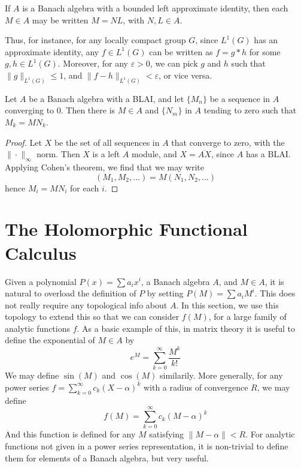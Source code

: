 \begin{corollary}
    If $A$ is a Banach algebra with a bounded left approximate identity, then each $M \in A$ may be written $M = NL$, with $N,L \in A$.
\end{corollary}

Thus, for instance, for any locally compact group $G$, since $L^1(G)$ has an approximate identity, any $f \in L^1(G)$ can be written as $f = g * h$ for some $g,h \in L^1(G)$. Moreover, for any $\varepsilon > 0$, we can pick $g$ and $h$ such that $\| g \|_{L^1(G)} \leq 1$, and $\| f - h \|_{L^1(G)} < \varepsilon$, or vice versa.

\begin{corollary}
    Let $A$ be a Banach algebra with a BLAI, and let $\{ M_n \}$ be a sequence in $A$ converging to 0. Then there is $M \in A$ and $\{ N_m \}$ in $A$ tending to zero such that $M_k = M N_k$.
\end{corollary}
\begin{proof}
    Let $X$ be the set of all sequences in $A$ that converge to zero, with the $\| \cdot \|_\infty$ norm. Then $X$ is a left $A$ module, and $X = \overline{AX}$, since $A$ has a BLAI. Applying Cohen's theorem, we find that we may write
    \[ (M_1, M_2, \dots) = M (N_1, N_2, \dots) \]
    hence $M_i = M N_i$ for each $i$.
\end{proof}






\section{The Holomorphic Functional Calculus}

Given a polynomial $P(x) = \sum a_i x^i$, a Banach algebra $A$, and $M \in A$, it is natural to overload the definition of $P$ by setting $P(M) = \sum a_i M^i$. This does not really require any topological info about $A$. In this section, we use this topology to extend this so that we can consider $f(M)$, for a large family of analytic functions $f$. As a basic example of this, in matrix theory it is useful to define the exponential of $M \in A$ by
%
\[ e^M = \sum_{k = 0}^\infty \frac{M^k}{k!} \]
%
We may define $\sin(M)$ and $\cos(M)$ similarily. More generally, for any power series $f = \sum_{k = 0}^\infty c_k (X - \alpha)^k$ with a radius of convergence $R$, we may define
%
\[ f(M) = \sum_{k = 0}^\infty c_k (M - \alpha)^k \]
%
And this function is defined for any $M$ satisfying $\|M - \alpha \| < R$. For analytic functions not given in a power series representation, it is non-trivial to define them for elements of a Banach algebra, but very useful.

